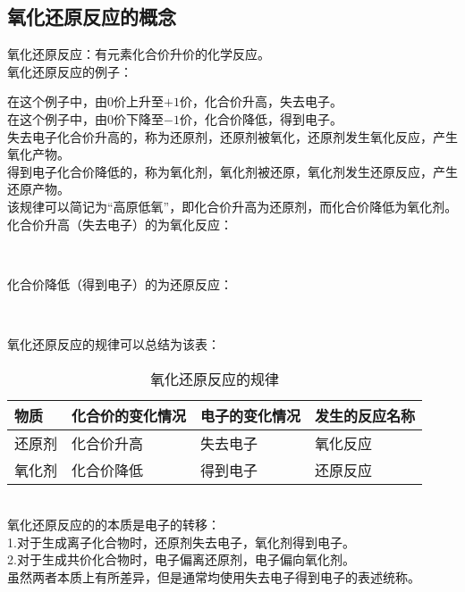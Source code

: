 \documentclass[UTF8]{ctexart}
\newcommand{\LiDrawContainer}[6][solid]
{
    \coordinate (A1) at #2;
    \coordinate (A2) at #3;
    \coordinate (B1) at ($#2+(0,#4)$);
    \coordinate (B2) at ($#3+(0,#4)$);

    \draw (A1)--(B1);
    \draw[#1] (B2)--(A2);
    \draw (B1)--(B2);

    \node at($0.5*(B1)+0.5*(B2)+(0,#5)$) {#6};
}
\begin{document}
\subsection{氧化还原反应的概念}
    氧化还原反应：有元素化合价升价的化学反应。\\[3mm]
    氧化还原反应的例子：
    \begin{center}
    \end{center}
    在这个例子中，由$0$价上升至$+1$价，化合价升高，失去电子。\\[3mm]
    在这个例子中，由$0$价下降至$-1$价，化合价降低，得到电子。\\[8mm]
    失去电子化合价升高的，称为还原剂，还原剂被氧化，还原剂发生氧化反应，产生氧化产物。\\[3mm]
    得到电子化合价降低的，称为氧化剂，氧化剂被还原，氧化剂发生还原反应，产生还原产物。\\[3mm]
    该规律可以简记为“高原低氧”，即化合价升高为还原剂，而化合价降低为氧化剂。\\[3mm]
    化合价升高（失去电子）的为氧化反应：
    \begin{center}
        \\[6mm]
    \end{center}
    化合价降低（得到电子）的为还原反应：
    \begin{center}
        \\[6mm]
    \end{center}
    氧化还原反应的规律可以总结为该表：\vspace{5pt}
    \begin{table}[h]
        \begin{center}
            \begin{tabular}{p{50pt}|p{95pt}|p{85pt}|p{85pt}}
                \hline
                物质&化合价的变化情况&电子的变化情况&发生的反应名称\\ \hline
                还原剂&化合价升高&失去电子&氧化反应\\ \hline
                氧化剂&化合价降低&得到电子&还原反应\\ \hline
            \end{tabular}
            \caption{氧化还原反应的规律}
        \end{center}
    \end{table}\\
    氧化还原反应的的本质是电子的转移：\\[3mm]
    1.对于生成离子化合物时，还原剂失去电子，氧化剂得到电子。\\[3mm]
    2.对于生成共价化合物时，电子偏离还原剂，电子偏向氧化剂。\\[3mm]
    虽然两者本质上有所差异，但是通常均使用失去电子得到电子的表述统称。
\end{document}
